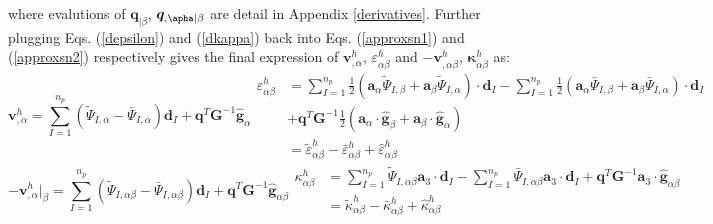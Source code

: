 where evalutions of $\boldsymbol q_{\vert \beta}$, $\boldsymbol q_{,\apha\vert\beta}$ are detail in Appendix \ref{derivatives}. Further plugging Eqs. (\ref{depsilon}) and (\ref{dkappa}) back into Eqs. (\ref{approxsn1}) and (\ref{approxsn2}) respectively gives the final expression of $\boldsymbol v^h_{,\alpha}$, $\varepsilon^h_{\alpha\beta}$ and $-\boldsymbol v^h_{,\alpha\beta}$, $\boldsymbol \kappa^h_{\alpha\beta}$ as: \begin{subequations}
\begin{equation}
\boldsymbol v^h_{,\alpha} = \sum_{I=1}^{n_p}(
\tilde \Psi_{I,\alpha} - \bar \Psi_{I,\alpha}) \boldsymbol d_I +
\boldsymbol q^T \boldsymbol G^{-1}\hat{\boldsymbol g}_{\alpha}
\end{equation}
\begin{equation}\label{epsilonh}
\begin{split}
\varepsilon^h_{\alpha\beta} &= 
\sum_{I=1}^{n_p} \frac{1}{2}(\boldsymbol a_\alpha \tilde \Psi_{I,\beta} + \boldsymbol a_\beta \tilde \Psi_{I,\alpha}) \cdot \boldsymbol d_I 
- \sum_{I=1}^{n_p} \frac{1}{2}(\boldsymbol a_\alpha \bar \Psi_{I,\beta} + \boldsymbol a_\beta \bar \Psi_{I,\alpha}) \cdot \boldsymbol d_I \\
&+ \boldsymbol q^T \boldsymbol G^{-1} \frac{1}{2}(\boldsymbol a_\alpha \cdot \hat{\boldsymbol g}_{\beta} + \boldsymbol a_\beta \cdot \hat{\boldsymbol g}_{\alpha}) \\
&= \tilde \varepsilon^h_{\alpha\beta} - \bar \varepsilon^h_{\alpha\beta} + \hat \varepsilon^h_{\alpha\beta}
\end{split}
\end{equation}
\end{subequations}
\begin{subequations}
\begin{equation}
-\boldsymbol v^h_{,\alpha}\vert_\beta = \sum_{I=1}^{n_p} (
\tilde \Psi_{I,\alpha\beta} -
\bar \Psi_{I,\alpha\beta} ) \boldsymbol d_I +
\boldsymbol q^T \boldsymbol G^{-1}\hat{\boldsymbol g}_{\alpha\beta}
\end{equation}
\begin{equation}\label{kappah}
\begin{split}
\kappa^h_{\alpha\beta} &= \sum_{I=1}^{n_p} \tilde \Psi_{I,\alpha\beta} \boldsymbol a_3 \cdot \boldsymbol d_I
- \sum_{I=1}^{n_p} \bar \Psi_{I,\alpha\beta} \boldsymbol a_3 \cdot \boldsymbol d_I +
\boldsymbol q^T \boldsymbol G^{-1}\boldsymbol a_3 \cdot \hat{\boldsymbol g}_{\alpha\beta} \\
&= \tilde \kappa^h_{\alpha\beta} - \bar \kappa^h_{\alpha\beta} + \hat \kappa^h_{\alpha\beta}
\end{split}
\end{equation}
\end{subequations}
